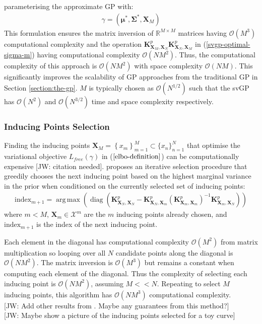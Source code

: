 \documentclass{article}
\newcommand{\jw}[1]{{\color{gray} [JW: #1]}}
\newcommand{\diag}{\operatorname{diag}}
\DeclareMathOperator*{\argmax}{arg\,max}
\numberwithin{equation}{section}
\begin{document}
parameterising the approximate GP with:
\begin{align}
    \gamma = \left(\boldsymbol{\mu}^*, \mathbf{\Sigma}^*,  \mathbf{X}_M\right)
    \label{titsias-svgp-parameters}
\end{align}
This formulation ensures the matrix inversion of $\mathbb{R}^{M \times M}$ matrices having $\mathcal{O}\left(M^3\right)$ computational complexity and the operation $\mathbf{K}^p_{\mathbf{X}_M, \mathbf{X}_N} \mathbf{K}^p_{\mathbf{X}_N, \mathbf{X}_M} $ in (\ref{svgp-optimal-sigma-m}) having computational complexity $\mathcal{O}\left(NM^2\right)$. Thus, the computational complexity of this approach is $\mathcal{O}\left(NM^2\right)$ with space complexity $\mathcal{O}\left(NM\right)$. This significantly improves the scalability of GP approaches from the traditional GP in Section \ref{section:the-gp}. $M$ is typically chosen as $\mathcal{O}(N^{1/2})$ such that the svGP has $\mathcal{O}(N^{2})$ and $\mathcal{O}(N^{3/2})$ time and space complexity respectively.

\subsubsection{Inducing Points Selection}
Finding the inducing points $\mathbf{X}_M = \left\{x_m\right\}_{m=1}^{M} \subset \{x_n\}_{n=1}^{N}$ that optimise the variational objective $L_{free}(\gamma)$ in ($\ref{elbo-definition}$) can be computationally expensive \jw{citation needed}. \cite{burt2020convergence} proposes an iterative selection procedure that greedily chooses the next inducing point based on the highest marginal variance in the prior when conditioned on the currently selected set of inducing points:
\begin{align}
    \label{greedy-varaince-selection}
    \text{index}_{m+1} = \argmax \left(\diag \left(\mathbf{K}^p_{\mathbf{X}_N, \mathbf{X}_N} - \mathbf{K}^p_{\mathbf{X}_N, \mathbf{X}_{m}} \left(\mathbf{K}^p_{\mathbf{X}_{m}, \mathbf{X}_{m}}\right)^{-1}\mathbf{K}^p_{\mathbf{X}_{m}, \mathbf{X}_N}\right)\right)
\end{align}
where $m < M$, $\mathbf{X}_{m} \in \mathcal{X}^m$ are the $m$ inducing points already chosen, and $\text{index}_{m+1}$ is the index of the next inducing point.

Each element in the diagonal has computational complexity $\mathcal{O}(M^2)$ from matrix multiplication so looping over all $N$ candidate points along the diagonal is $\mathcal{O}(NM^2)$. The matrix inversion is $\mathcal{O}(M^3)$ but remains a constant when computing each element of the diagonal. Thus the complexity of selecting each inducing point is $\mathcal{O}(NM^2)$, assuming $M << N$. Repeating to select $M$ inducing points, this algorithm has $\mathcal{O}(NM^3)$ computational complexity.
\\\jw{Add other results from \cite{burt2020convergence}. Maybe any guarantees from this method?}
\\\jw{Maybe show a picture of the inducing points selected for a toy curve}
\end{document}
